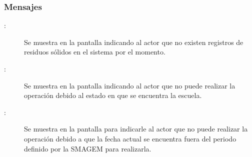 \subsubsection{Mensajes}

    \begin{description}
	\item [:] Se muestra en la pantalla  indicando al actor que no existen registros de residuos sólidos en el sistema por el momento.
	
	\item[:] Se muestra en la pantalla  indicando al actor que no puede realizar la operación debido al estado en que se encuentra la escuela.
	
	\item [:] Se muestra en la pantalla  para indicarle al actor que no puede realizar la operación debido a que la fecha actual se encuentra fuera del periodo definido por la SMAGEM para realizarla.
    \end{description}